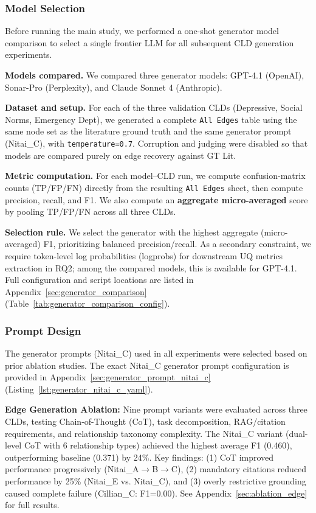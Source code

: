 \subsubsection{Model Selection}

Before running the main study, we performed a one-shot generator model comparison to select a single frontier LLM for all subsequent CLD generation experiments.

\textbf{Models compared.} We compared three generator models: GPT-4.1 (OpenAI), Sonar-Pro (Perplexity), and Claude Sonnet 4 (Anthropic).

\textbf{Dataset and setup.} For each of the three validation CLDs (Depressive, Social Norms, Emergency Dept), we generated a complete \texttt{All Edges} table using the same node set as the literature ground truth and the same generator prompt (Nitai\_C), with \texttt{temperature=0.7}. Corruption and judging were disabled so that models are compared purely on edge recovery against GT Lit.

\textbf{Metric computation.} For each model--CLD run, we compute confusion-matrix counts (TP/FP/FN) directly from the resulting \texttt{All Edges} sheet, then compute precision, recall, and F1. We also compute an \textbf{aggregate micro-averaged} score by pooling TP/FP/FN across all three CLDs.

\textbf{Selection rule.} We select the generator with the highest aggregate (micro-averaged) F1, prioritizing balanced precision/recall. As a secondary constraint, we require token-level log probabilities (logprobs) for downstream UQ metrics extraction in RQ2; among the compared models, this is available for GPT-4.1.
Full configuration and script locations are listed in Appendix~\ref{sec:generator_comparison} (Table~\ref{tab:generator_comparison_config}).

\subsubsection{Prompt Design}

The generator prompts (Nitai\_C) used in all experiments were selected based on prior ablation studies. The exact Nitai\_C generator prompt configuration is provided in Appendix~\ref{sec:generator_prompt_nitai_c} (Listing~\ref{lst:generator_nitai_c_yaml}).

\textbf{Edge Generation Ablation:} Nine prompt variants were evaluated across three CLDs, testing Chain-of-Thought (CoT), task decomposition, RAG/citation requirements, and relationship taxonomy complexity. The Nitai\_C variant (dual-level CoT with 6 relationship types) achieved the highest average F1 (0.460), outperforming baseline (0.371) by 24\%. Key findings: (1) CoT improved performance progressively (Nitai\_A$\rightarrow$B$\rightarrow$C), (2) mandatory citations reduced performance by 25\% (Nitai\_E vs. Nitai\_C), and (3) overly restrictive grounding caused complete failure (Cillian\_C: F1=0.00). See Appendix~\ref{sec:ablation_edge} for full results.

